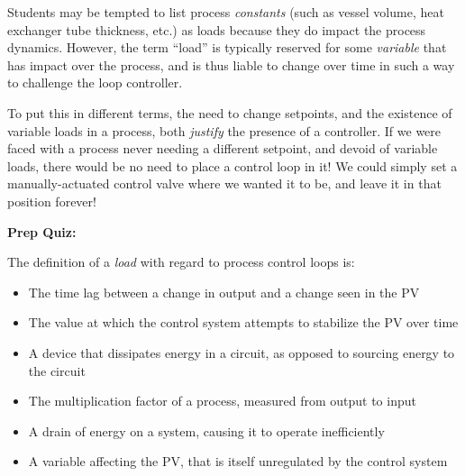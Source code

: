 





Students may be tempted to list process {\it constants} (such as vessel volume, heat exchanger tube thickness, etc.) as loads because they do impact the process dynamics.  However, the term ``load'' is typically reserved for some {\it variable} that has impact over the process, and is thus liable to change over time in such a way to challenge the loop controller.

To put this in different terms, the need to change setpoints, and the existence of variable loads in a process, both {\it justify} the presence of a controller.  If we were faced with a process never needing a different setpoint, and devoid of variable loads, there would be no need to place a control loop in it!  We could simply set a manually-actuated control valve where we wanted it to be, and leave it in that position forever!

\vfil \eject

\noindent
{\bf Prep Quiz:}

The definition of a {\it load} with regard to process control loops is:

\begin{itemize}
\item{} The time lag between a change in output and a change seen in the PV
\vskip 5pt 
\item{} The value at which the control system attempts to stabilize the PV over time
\vskip 5pt 
\item{} A device that dissipates energy in a circuit, as opposed to sourcing energy to the circuit
\vskip 5pt 
\item{} The multiplication factor of a process, measured from output to input
\vskip 5pt 
\item{} A drain of energy on a system, causing it to operate inefficiently
\vskip 5pt 
\item{} A variable affecting the PV, that is itself unregulated by the control system
\end{itemize}








